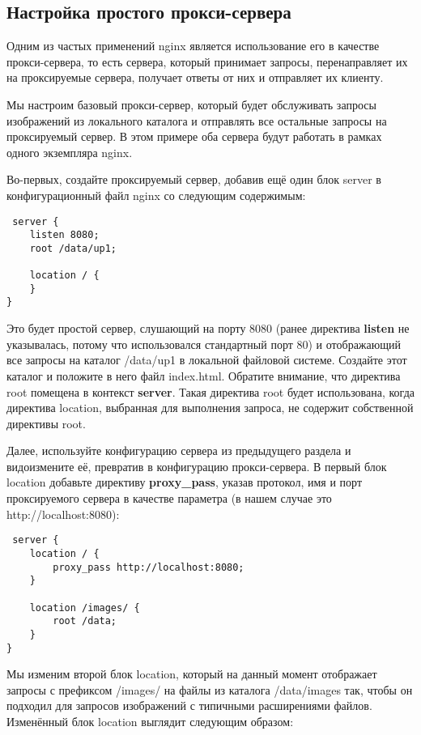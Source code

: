\documentclass[a4paper,10pt,twoside]{article}
\begin{document}
\subsection{Настройка простого прокси-сервера}
Одним из частых применений nginx является использование его в качестве прокси-сервера, то есть сервера, который принимает запросы, перенаправляет их на проксируемые сервера, получает ответы от них и отправляет их клиенту.

Мы настроим базовый прокси-сервер, который будет обслуживать запросы изображений из локального каталога и отправлять все остальные запросы на проксируемый сервер. В этом примере оба сервера будут работать в рамках одного экземпляра nginx.

Во-первых, создайте проксируемый сервер, добавив ещё один блок server в конфигурационный файл nginx со следующим содержимым:

\begin{verbatim}
 server {
    listen 8080;
    root /data/up1;

    location / {
    }
}
\end{verbatim} 
Это будет простой сервер, слушающий на порту 8080 (ранее директива \textbf{listen} не указывалась, потому что использовался стандартный порт 80) и отображающий все запросы на каталог /data/up1 в локальной файловой системе. Создайте этот каталог и положите в него файл index.html. Обратите внимание, что директива root помещена в контекст \textbf{server}. Такая директива root будет использована, когда директива location, выбранная для выполнения запроса, не содержит собственной директивы root.

Далее, используйте конфигурацию сервера из предыдущего раздела и видоизмените её, превратив в конфигурацию прокси-сервера. В первый блок location добавьте директиву \textbf{proxy\_pass}, указав протокол, имя и порт проксируемого сервера в качестве параметра (в нашем случае это http://localhost:8080):

\begin{verbatim}
 server {
    location / {
        proxy_pass http://localhost:8080;
    }

    location /images/ {
        root /data;
    }
}
\end{verbatim} 
Мы изменим второй блок location, который на данный момент отображает запросы с префиксом /images/ на файлы из каталога /data/images так, чтобы он подходил для запросов изображений с типичными расширениями файлов. Изменённый блок location выглядит следующим образом:
\end{document}
